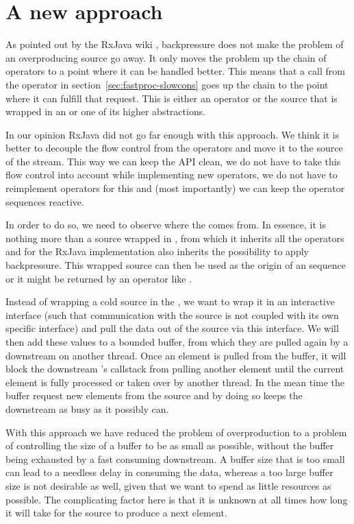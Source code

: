 \section{A new approach}
As pointed out by the RxJava wiki \cite{RxJava-Wiki-Backpressure}, backpressure does not make the problem of an overproducing source go away. It only moves the problem up the chain of operators to a point where it can be handled better. This means that a  call from the  operator in section~\ref{sec:fastproc-slowcons} goes up the chain to the point where it can fulfill that request. This is either an operator or the source that is wrapped in an  or one of its higher abstractions.

In our opinion RxJava did not go far enough with this approach. We think it is better to decouple the flow control from the operators and move it to the source of the stream. This way we can keep the API clean, we do not have to take this flow control into account while implementing new operators, we do not have to reimplement operators for this and (most importantly) we can keep the operator sequences reactive.

In order to do so, we need to observe where the \obs comes from. In essence, it is nothing more than a source wrapped in , from which it inherits all the operators and for the RxJava implementation also inherits the possibility to apply backpressure. This wrapped source can then be used as the origin of an \obs sequence or it might be returned by an operator like .

Instead of wrapping a cold source in the , we want to wrap it in an interactive interface (such that communication with the source is not coupled with its own specific interface) and pull the data out of the source via this interface. We will then add these values to a bounded buffer, from which they are pulled again by a downstream \obs on another thread. Once an element is pulled from the buffer, it will block the downstream \obs's callstack from pulling another element until the current element is fully processed or taken over by another thread. In the mean time the buffer request new elements from the source and by doing so keeps the downstream \obs as busy as it possibly can.


With this approach we have reduced the problem of overproduction to a problem of controlling the size of a buffer to be as small as possible, without the buffer being exhausted by a fast consuming downstream. A buffer size that is too small can lead to a needless delay in consuming the data, whereas a too large buffer size is not desirable as well, given that we want to spend as little resources as possible. The complicating factor here is that it is unknown at all times how long it will take for the source to produce a next element.

